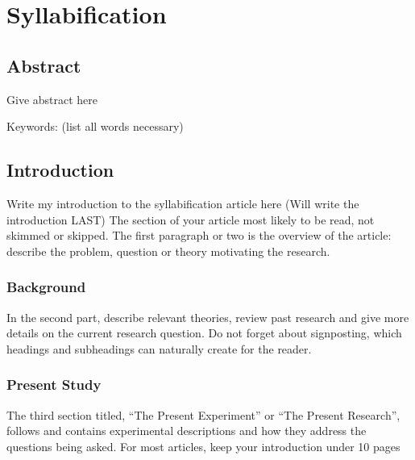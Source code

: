 
\chapter{Syllabification} %

\label{Chapter2} %


\section{Abstract}

Give abstract here

Keywords: (list all words necessary)


\section{Introduction}

Write my introduction to the syllabification article here (Will write the introduction LAST)
The section of your article most likely to be read, not skimmed or skipped. The first paragraph or two is the overview of the article: describe the problem, question or theory motivating the research. 

\subsection{Background}

In the second part, describe relevant theories, review past research and give more details on the current research question. Do not forget about signposting, which headings and subheadings can naturally create for the reader.


\subsection{Present Study}
The third section titled, “The Present Experiment” or “The Present Research”, follows and contains experimental descriptions and how they address the questions being asked.
For most articles, keep your introduction under 10 pages

